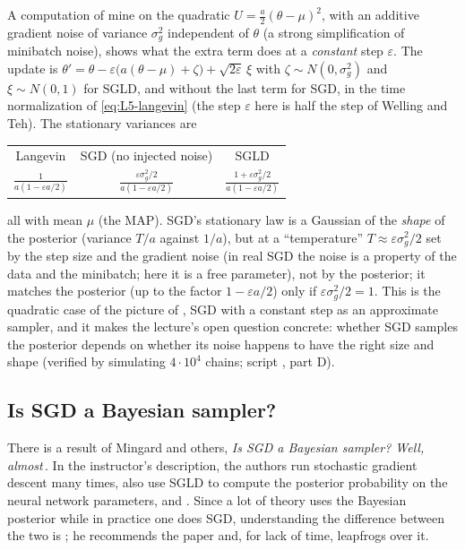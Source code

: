 \begin{beyond}
A computation of mine on the quadratic $U=\frac a2(\theta-\mu)^2$, with an additive gradient noise of variance $\sigma_g^2$ independent of $\theta$ (a strong simplification of minibatch noise), shows what the extra term does at a \emph{constant} step $\varepsilon$. The update is $\theta'=\theta-\varepsilon\big(a(\theta-\mu)+\zeta\big)+\sqrt{2\varepsilon}\,\xi$ with $\zeta\sim N(0,\sigma_g^2)$ and $\xi\sim N(0,1)$ for SGLD, and without the last term for SGD, in the time normalization of \eqref{eq:L5-langevin} (the step $\varepsilon$ here is half the step of Welling and Teh). The stationary variances are
\begin{center}\renewcommand{\arraystretch}{1.9}
\begin{tabular}{@{}ccc@{}}
  \textsf{\small Langevin} & \textsf{\small SGD (no injected noise)} & \textsf{\small SGLD}\\
  $\displaystyle\frac{1}{a(1-\varepsilon a/2)}$ & $\displaystyle\frac{\varepsilon\sigma_g^2/2}{a(1-\varepsilon a/2)}$ & $\displaystyle\frac{1+\varepsilon\sigma_g^2/2}{a(1-\varepsilon a/2)}$
\end{tabular}\end{center}
all with mean $\mu$ (the MAP). SGD's stationary law is a Gaussian of the \emph{shape} of the posterior (variance $T/a$ against $1/a$), but at a ``temperature'' $T\approx\varepsilon\sigma_g^2/2$ set by the step size and the gradient noise (in real SGD the noise is a property of the data and the minibatch; here it is a free parameter), not by the posterior; it matches the posterior (up to the factor $1-\varepsilon a/2$) only if $\varepsilon\sigma_g^2/2=1$. This is the quadratic case of the picture of \citet{mandt2017}, SGD with a constant step as an approximate sampler, and it makes the lecture's open question concrete: whether SGD samples the posterior depends on whether its noise happens to have the right size and shape (verified by simulating $4\cdot10^4$ chains; script , part D).
\end{beyond}

\subsection{Is SGD a Bayesian sampler?}\label{sec:L5-mingard}
There is a result of Mingard and others, \emph{Is SGD a Bayesian sampler? Well, almost}\,\citep{mingard2021}. In the instructor's description, the authors run stochastic gradient descent many times, also use SGLD to compute the posterior probability on the neural network parameters, and . Since a lot of theory uses the Bayesian posterior while in practice one does SGD, understanding the difference between the two is ; he recommends the paper and, for lack of time, leapfrogs over it.

